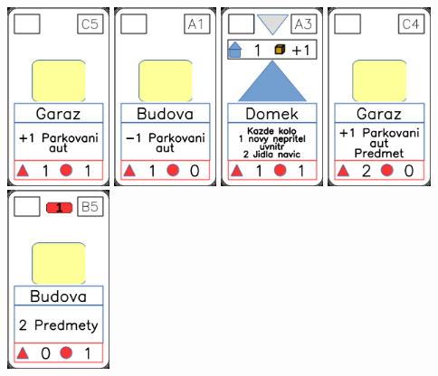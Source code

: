 \documentclass[a4paper]{article}
\begin{document}
	\includegraphics[width=3.0cm]{img-2_14}
	\includegraphics[width=3.0cm]{img-2_0}
	\includegraphics[width=3.0cm]{img-3_2}
	\includegraphics[width=3.0cm]{img-2_13}
	\includegraphics[width=3.0cm]{img-2_9}
\end{document}
